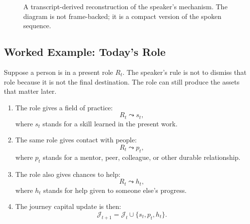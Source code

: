 \begin{figure}
\centering
{}
\caption{A transcript-derived reconstruction of the speaker's mechanism. The diagram is not frame-backed; it is a compact version of the spoken sequence.}
\end{figure}

\subsection{Worked Example: Today's Role}

Suppose a person is in a present role \(R_t\). The speaker's rule is not to dismiss that role because it is not the final destination. The role can still produce the assets that matter later.

\begin{enumerate}
\item The role gives a field of practice:
\[
R_t \leadsto s_t,
\]
where \(s_t\) stands for a skill learned in the present work.

\item The same role gives contact with people:
\[
R_t \leadsto p_t,
\]
where \(p_t\) stands for a mentor, peer, colleague, or other durable relationship.

\item The role also gives chances to help:
\[
R_t \leadsto h_t,
\]
where \(h_t\) stands for help given to someone else's progress.

\item The journey capital update is then:
\[
\mathcal{J}_{t+1}
=
\mathcal{J}_t \cup \{s_t,p_t,h_t\}.
\]
\end{enumerate}

